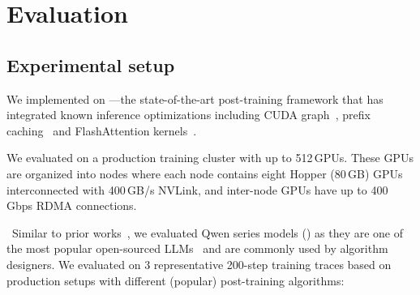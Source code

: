 \section{Evaluation}
\label{sec:eval}

\subsection{Experimental setup}
\label{sec:eval-setup}

\noindent
We implemented {\sys} on {\verl}---the state-of-the-art
post-training framework that
has integrated known inference optimizations
including CUDA graph~\cite{vllm-code},
prefix caching~\cite{DBLP:journals/corr/abs-2402-03300} 
and FlashAttention kernels~\cite{DBLP:conf/nips/ShahBZTRD24}. 

We evaluated {\sys} on a production training cluster
with up to 512\,GPUs.
These GPUs are organized into nodes where each node contains eight Hopper (80\,GB) GPUs
interconnected with {400}\,GB/s NVLink,
and inter-node GPUs have up to 400\,Gbps RDMA connections.

 \,
Similar to prior works~\cite{dapo,hybridflow,streamrl}, 
we evaluated Qwen series models ()
as they are one of the most popular open-sourced LLMs~\cite{dapo,DBLP:journals/corr/abs-2504-05118,gspo}
and are commonly used by algorithm designers. 
We evaluated on {3} 
representative 200-step training traces based on production setups
with different (popular) post-training algorithms: \\[-18pt]

